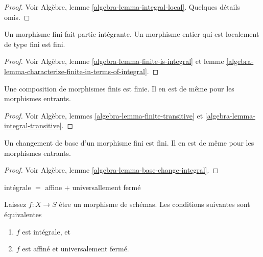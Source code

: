 \begin{proof}
Voir Algèbre, lemme \ref{algebra-lemma-integral-local}. Quelques détails omis.
\end{proof}

\begin{lemma}

\label{lemma-finite-integral}

Un morphisme fini fait partie intégrante. Un morphisme entier qui est localement de type fini est fini.

\end{lemma}

\begin{proof}
Voir Algèbre, lemme \ref{algebra-lemma-finite-is-integral} et lemme \ref{algebra-lemma-characterize-finite-in-terms-of-integral}.
\end{proof}

\begin{lemma}

\label{lemma-composition-finite}

Une composition de morphismes finis est finie. Il en est de même pour les morphismes entrants.

\end{lemma}

\begin{proof}
Voir Algèbre, lemmes \ref{algebra-lemma-finite-transitive} et \ref{algebra-lemma-integral-transitive}.
\end{proof}

\begin{lemma}

\label{lemma-base-change-finite}

Un changement de base d'un morphisme fini est fini. Il en est de même pour les morphismes entrants.

\end{lemma}

\begin{proof}
Voir Algèbre, lemme \ref{algebra-lemma-base-change-integral}.
\end{proof}

\begin{lemma}

\label{lemma-integral-universally-closed}

\begin{slogan}
intégrale $=$ affine $+$ universallement fermé
\end{slogan}
Laissez $f : X \to S$ être un morphisme de schémas. Les conditions suivantes sont équivalentes
\begin{enumerate}
\item $f$ est intégrale, et
\item $f$ est affiné et universalement fermé.
\end{enumerate}

\end{lemma}


